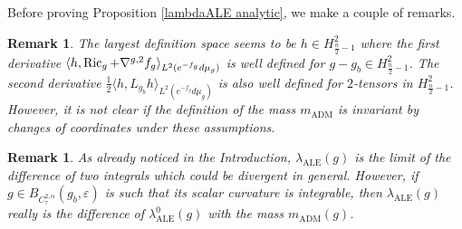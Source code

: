 \documentclass[a4paper,11pt,reqno]{amsart}
\newtheorem{rk}[defn]{Remark}
\def\Ric{\mathop{\rm Ric}\nolimits}
\def\Ric{\mathop{\rm Ric}\nolimits}
\numberwithin{equation}{section}
\begin{document}
	Before proving Proposition \ref{lambdaALE analytic}, we make a couple of remarks.
	\begin{rk}
		The largest definition space seems to be $h\in H^2_{\frac{n}{2}-1}$ where the first derivative $\langle h, \Ric_g+\nabla^{g,2}f_g\rangle_{L^2(e^{-f_g}d\mu_g)}$ is well defined for $g-g_b\in H^2_{\frac{n}{2}-1}$. The second derivative $\frac{1}{2}\langle h, L_{g_b}h\rangle_{L^2(e^{-f_g}d\mu_g)}$ is also well defined for $2$-tensors in $H^2_{\frac{n}{2}-1}$. However, it is not clear if the definition of the mass $m_{\operatorname{ADM}}$ is invariant by changes of coordinates under these assumptions.
	\end{rk}
	\begin{rk}
	As already noticed in the Introduction, $\lambda_{\operatorname{ALE}}(g)$ is the limit of the difference of two integrals which could be divergent in general. However, if $g\in B_{C^{2,\alpha}_{\tau}}(g_b,\varepsilon)$ is such that its scalar curvature is integrable, then $\lambda_{\operatorname{ALE}}(g)$ really is the difference of $\lambda_{\operatorname{ALE}}^0(g)$ with the mass $m_{\operatorname{ADM}}(g)$.
	\end{rk}
\end{document}
